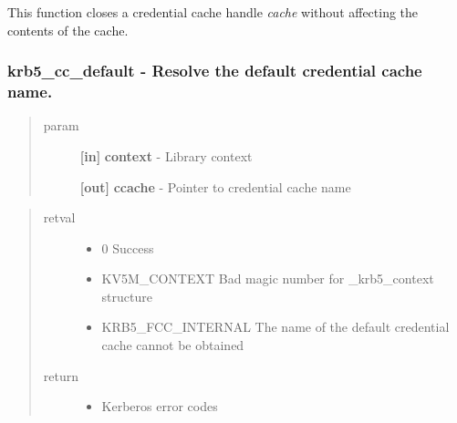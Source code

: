 \documentclass[letterpaper,10pt,english]{sphinxmanual}
\begin{document}
This function closes a credential cache handle \emph{cache} without affecting the contents of the cache.


\subsubsection{krb5\_cc\_default -  Resolve the default credential cache name.}
\label{appdev/refs/api/krb5_cc_default::doc}\label{appdev/refs/api/krb5_cc_default:krb5-cc-default-resolve-the-default-credential-cache-name}

\begin{fulllineitems}
\label{appdev/refs/api/krb5_cc_default:krb5_cc_default}
\end{fulllineitems}

\begin{quote}\begin{description}
\item[{param}] \leavevmode
\textbf{{[}in{]}} \textbf{context} - Library context

\textbf{{[}out{]}} \textbf{ccache} - Pointer to credential cache name

\end{description}\end{quote}
\begin{quote}\begin{description}
\item[{retval}] \leavevmode\begin{itemize}
\item {} 
0   Success

\item {} 
KV5M\_CONTEXT   Bad magic number for \_krb5\_context structure

\item {} 
KRB5\_FCC\_INTERNAL   The name of the default credential cache cannot be obtained

\end{itemize}

\item[{return}] \leavevmode\begin{itemize}
\item {} 
Kerberos error codes

\end{itemize}

\end{description}\end{quote}
\end{document}
